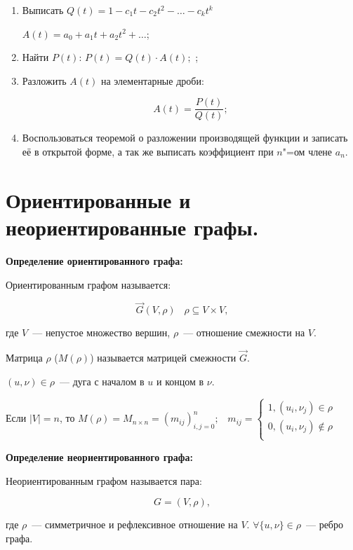     \begin{enumerate}
        \item{Выписать $Q(t) = 1 - c_1t - c_2t^2 - \dots - c_kt^k$
        
        $A(t) = a_0 + a_1t + a_2t^2 + \dots$;}
        \item{Найти $P(t)$: $P(t) = Q(t) \cdot A(t);$ ;}
        \item{Разложить $A(t)$ на элементарные дроби:
        
        \[
            A(t) = \frac{P(t)}{Q(t)};  
        \]}
        \item{Воспользоваться теоремой о разложении производящей функции
        и записать её в открытой форме, а так же выписать коэффициент при
        $n$"=ом члене $a_n$.}
    \end{enumerate}

\section{Ориентированные и неориентированные графы.}

\textbf{Определение ориентированного графа:}
    \smallskip

    Ориентированным графом называется:

    \[
        \overrightarrow{G}(V, \rho) \;\;\; \rho \subseteq V \times V,
    \]

    где $V$~--- непустое множество вершин, $\rho$~--- отношение смежности на $V$.
    \smallskip

    Матрица $\rho$ ($M(\rho)$) называется матрицей смежности $\overrightarrow{G}$.

    $(u, \nu) \in \rho$~--- дуга с началом в $u$ и концом в $\nu$.

    Если $|V| = n$, то $M(\rho) = M_{n \times n} = (m_{ij})^n_{i, j = 0}; \;\;\;
    m_{ij} = 
    \begin{cases}
        1, (u_i, \nu_j) \in \rho\\
        0, (u_i, \nu_j) \notin \rho\\
    \end{cases}$
    \bigskip

\textbf{Определение неориентированного графа:}
    \smallskip

    Неориентированным графом называется пара:

    \[
        G = (V, \rho),  
    \]

    где $\rho$~--- симметричное и рефлексивное отношение на $V$. $\forall
    \{u, \nu\} \in \rho$~--- ребро графа.

